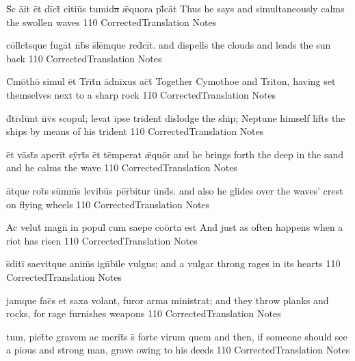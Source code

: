 \latline
  {S\={\macron {\i}}c \={ai}t \=et d\=ict\={} c\-it\-i\=us t\-um\-id\sout{a }\={\ae}qu\-or\-a pl\={}c\=at}
  { Thus he says and simultaneously calms the swollen waves }
  {110}
  { CorrectedTranslation }
  { Notes }


\latline
  {c\=oll\={}ct\={}squ\-e f\-ug\=at n\={}b\={}s s\={}l\=emqu\-e r\-ed\={}c\=it.}
  { and dispells the clouds and leads the sun back }
  {110}
  { CorrectedTranslation }
  { Notes }


\latline
  {C\={}m\=otho\={} s\-im\-ul \=et Tr\={\i}t\={}n \=adn\=ix\-us \-ac\={}t\={}}
  { Together Cymothoe and Triton, having set themselves next to a sharp rock }
  {110}
  { CorrectedTranslation }
  { Notes }

\latline
  {d\={}tr\={}d\=unt n\={}v\={\macron {\i}}s sc\-op\-ul\={}; l\-ev\-at \=ips\-e tr\-id\=ent\={\macron {\i}}}
  { dislodge the ship;  Neptune himself lifts the ships by means of his trident  }
  {110}
  { CorrectedTranslation }
  { Notes }


\latline
  {\=et v\=ast\={}s \-ap\-er\=it s\=yrt\={\macron {\i}}s \=et t\=emp\-er\-at \={\ae}qu\=or}
  { and he brings forth the deep in the sand and he calms the wave }
  {110}
  { CorrectedTranslation }
  { Notes }


\latline
  {\=atqu\-e r\-ot\={\macron {\i}}s s\=umm\={}s l\-ev\-ib\=us p\=er\={}b\-it\-ur \=und\={}s.}
  { and also he glides over the waves' crest on flying wheels }
  {110}
  { CorrectedTranslation }
  { Notes }

\latline
  {Ac velut\={\macron {\i}} magn\={} in popul\={} cum saepe co\"orta est}
  { And just as often happens when a riot has risen }
  {110}
  { CorrectedTranslation }
  { Notes }


\latline
  {s\={}diti\={} saevitque anim\={\macron {\i}}s ign\={}bile vulgus;}
  { and a vulgar throng rages in its hearts }
  {110}
  { CorrectedTranslation }
  { Notes }


\latline
  {jamque fac\={}s et saxa volant, furor arma ministrat;}
  { and they throw planks and rocks, for rage furnishes weapons }
  {110}
  { CorrectedTranslation }
  { Notes }


\latline
  {tum, piet\={}te gravem ac merit\={\macron {\i}}s s\={\macron {\i}} forte virum quem}
  { and then, if someone should see a pious and strong man, grave owing to his deeds }
  {110}
  { CorrectedTranslation }
  { Notes }


